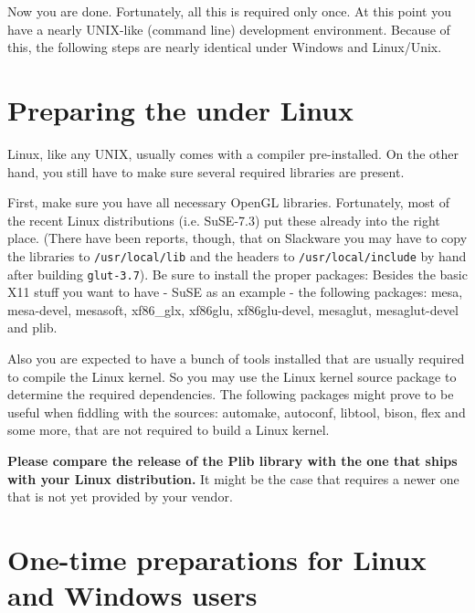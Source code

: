 Now you are done. Fortunately, all this is required only once. At this point you have
a nearly UNIX-like (command line) development environment. Because of this, the following
steps are nearly identical under Windows and Linux/Unix.

\section{Preparing the  under Linux\label{preparelin}}
Linux, like any UNIX, usually comes with a compiler pre-installed. On
the other hand, you still have to make sure several required libraries
are present.

First, make sure you have all necessary OpenGL libraries. Fortunately,
most of the recent Linux distributions (i.e. SuSE-7.3) put these
already into the right place. (There have been reports, though, that on
Slackware you may have to copy the libraries to \texttt{/usr/local/lib}
and the headers to \texttt{/usr/local/include} by hand after building
\texttt{glut-3.7}). Be sure to install the proper packages: Besides the
basic X11 stuff you want to have - SuSE as an example - the following
packages: mesa, mesa-devel, mesasoft, xf86\_glx, xf86glu,
xf86glu-devel, mesaglut, mesaglut-devel and plib.

Also you are expected to have a bunch of tools installed that are usually
required to compile the Linux kernel. So you may use the Linux kernel source
package to determine the required dependencies. The following packages
might prove to be useful when fiddling with the \FlightGear{} sources:
automake, autoconf, libtool, bison, flex and some more, that are not
required to build a Linux kernel.

{\bfseries Please compare the release of the Plib library with the one that ships with
your Linux distribution.} It might be the case that \FlightGear{} requires a
newer one that is not yet provided by your vendor.

\section{One-time preparations for Linux and Windows users\label{preparelinwin}}

